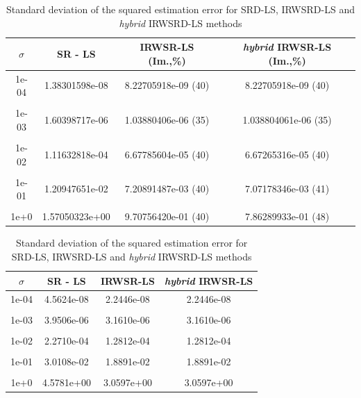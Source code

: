 \begin{table}[h]
\centering
\caption{MSE of position estimation for SRD-LS, IRWSRD-LS and \textit{hybrid} IRWSRD-LS methods}
\phantom{m}
\begin{tabular}{|c|c|c|c|} \hline
\centering
$\sigma$ & SR - LS & IRWSR-LS (Im.,\%) & \textit{hybrid} IRWSR-LS (Im.,\%) \\ \hline
1e-04&  1.38301598e-08 & 8.22705918e-09 (40) &  8.22705918e-09 (40) \\ &&&\\ 
1e-03&	1.60398717e-06 & 1.03880406e-06 (35)&  1.038804061e-06 (35) \\ &&&\\
1e-02&	1.11632818e-04 & 6.67785604e-05 (40)&  6.67265316e-05 (40)  \\ &&&\\
1e-01&	1.20947651e-02 & 7.20891487e-03 (40)&  7.07178346e-03 (41) 	 \\ &&&\\
1e+0&	1.57050323e+00 & 9.70756420e-01 (40)&  7.86289933e-01 (48)  \\ %
\hline
\end{tabular}
\label{tab:3}
\centering
\caption{Standard deviation of the squared estimation error for SRD-LS, IRWSRD-LS and \textit{hybrid} IRWSRD-LS methods}
\phantom{m}
\begin{tabular}{|c|c|c|c|} \hline
$\sigma$ & SR - LS & IRWSR-LS & \textit{hybrid} IRWSR-LS \\ \hline
1e-04&  4.5624e-08 &   2.2446e-08 &  2.2446e-08\\ &&&\\
1e-03&	3.9506e-06 &   3.1610e-06 &  3.1610e-06\\ &&&\\
1e-02&	2.2710e-04 &   1.2812e-04 &  1.2812e-04\\ &&&\\
1e-01&	3.0108e-02 &   1.8891e-02 &  1.8891e-02\\ &&&\\
1e+0&	4.5781e+00 &   3.0597e+00 &  3.0597e+00\\ %
\hline
\end{tabular}
\label{tab:4}
\end{table}


